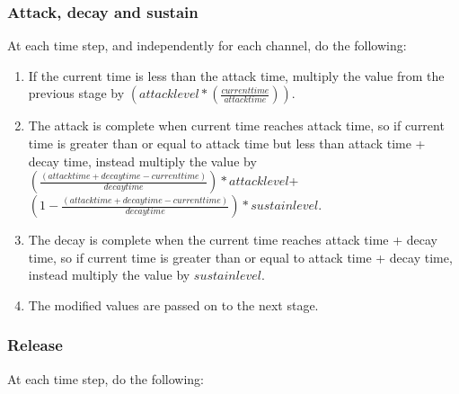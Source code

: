 \documentclass[letterpaper]{article}
\newcommand\liststyleLxi{%
\renewcommand\theenumi{\arabic{enumi}}
\renewcommand\theenumii{\alph{enumii}}
\renewcommand\labelenumi{ \theenumi.}
\renewcommand\labelenumii{ \theenumii)}
\renewcommand\labelitemi{•}
\renewcommand\labelitemii{•}
}
\begin{document}
\subsubsection{Attack, decay and sustain}
At each time step, and independently for each channel, do the following:

\liststyleLxi
\begin{enumerate}
\item If the current time is less than the attack time, multiply the
value from the previous stage by  $(\mathit{attack}\mathit{level}\ast
(\frac{\mathit{current}\mathit{time}}{\mathit{attack}\mathit{time}}))$.
\ 
\item The attack is complete when current time reaches attack time, so
if current time is greater than or equal to attack time but less than
attack time + decay time, instead multiply the value by 
$(\frac{(\mathit{attack}\mathit{time}+\mathit{decay}\mathit{time}-\mathit{current}\mathit{time})}{\mathit{decay}\mathit{time}})\ast
{\mathit{attack}\mathit{level}}$+
$(1-\frac{(\mathit{attack}\mathit{time}+\mathit{decay}\mathit{time}-\mathit{current}\mathit{time})}{\mathit{decay}\mathit{time}})\ast
{\mathit{sustain}\mathit{level}}$. \ 
\item The decay is complete when the current time reaches attack time +
decay time, so if current time is greater than or equal to attack time
+ decay time, instead multiply the value by 
$\mathit{sustain}\mathit{level}$. \ 
\item The modified values are passed on to the next stage.
\end{enumerate}
\subsubsection{Release}
At each time step, do the following:
\end{document}
